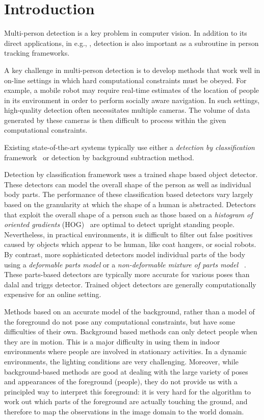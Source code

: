\documentclass[10pt,twocolumn,letterpaper]{article}
\begin{document}
\section{Introduction}
Multi-person detection is a key problem in computer vision.  In addition to its direct applications, in e.g., , detection is also important as a subroutine in person tracking  frameworks.  

A key challenge in multi-person detection is to develop methods that work well in on-line settings in which hard computational constraints must be obeyed. For example, a mobile robot may require real-time  estimates of the location of people in its environment in order to perform socially aware navigation.  In such settings, high-quality detection often necessitates multiple cameras.  The volume of data generated by these cameras is then difficult to process within the given computational constraints.  

Existing state-of-the-art systems typically use either a \emph{detection by classification} framework~\cite{Pami-11} or detection by background subtraction method.

Detection by classification framework uses a trained shape based object detector. These detectors can model the overall shape of the person as well as individual body parts. The performance of these classification based detectors vary largely based on the granularity at which the shape of a human is abstracted.   
Detectors that exploit the overall shape of a person such as those based on a \emph{histogram of oriented gradients} (HOG)~\cite{dalaltriggs} are optimal to detect upright standing people. 
Nevertheless, in practical environments, it is difficult to filter out false positives caused by objects which appear to be human, like coat hangers, or social robots. By contrast, more sophisticated detectors model individual parts of the body using a \emph{deformable parts model} \cite{DPM} or a \emph{non-deformable mixture of parts model} ~\cite{partsDeva}. 
These parts-based detectors are typically more accurate for various poses than dalal and triggs detector. Trained object detectors are generally computationally expensive for an online setting. 

Methods based on an accurate model of the background, rather than a model of the foreground do not pose any computational constraints, but have some difficulties of their own. Background based methods can only detect people when they are in motion. This is a major difficulty in using them in indoor environments where people are involved in stationary activities. In a dynamic environments, the lighting conditions are very challenging. Moreover, while background-based methods are good at dealing with the large variety of poses and appearances of the foreground (people), they do not provide us with a principled way to interpret this foreground: it is very hard for the algorithm to work out which parts of the foreground are actually touching the ground, and therefore to map the observations in the image domain to the world domain.
\end{document}
